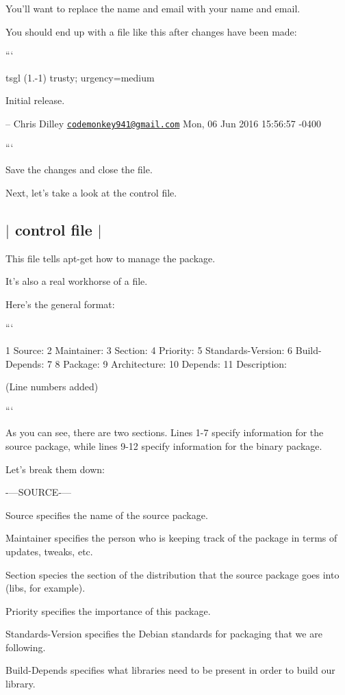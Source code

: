 You'll want to replace the name and email with your name and email.

You should end up with a file like this after changes have been made\-:

```

tsgl (1.-\/1) trusty; urgency=medium


\begin{DoxyItemize}
\item Initial release.
\end{DoxyItemize}

-- Chris Dilley \href{mailto:codemonkey941@gmail.com}{\tt codemonkey941@gmail.\-com} Mon, 06 Jun 2016 15\-:56\-:57 -\/0400

```

Save the changes and close the file.

Next, let's take a look at the {\ttfamily control} file. 

 \subsection*{$\vert$ {\ttfamily control} file $\vert$ }

This file tells {\ttfamily apt-\/get} how to manage the package.

It's also a real workhorse of a file.

Here's the general format\-:

```

1 Source\-: 2 Maintainer\-: 3 Section\-: 4 Priority\-: 5 Standards-\/\-Version\-: 6 Build-\/\-Depends\-: 7 8 Package\-: 9 Architecture\-: 10 Depends\-: 11 Description\-:

(Line numbers added)

```

As you can see, there are two sections. Lines 1-\/7 specify information for the source package, while lines 9-\/12 specify information for the binary package.

Let's break them down\-:

-\/---S\-O\-U\-R\-C\-E-\/---


\begin{DoxyItemize}
\item {\ttfamily Source} specifies the name of the source package.
\item {\ttfamily Maintainer} specifies the person who is keeping track of the package in terms of updates, tweaks, etc.
\item {\ttfamily Section} species the section of the distribution that the source package goes into (libs, for example).
\item {\ttfamily Priority} specifies the importance of this package.
\item {\ttfamily Standards-\/\-Version} specifies the Debian standards for packaging that we are following.
\item {\ttfamily Build-\/\-Depends} specifies what libraries need to be present in order to build our library.
\end{DoxyItemize}

